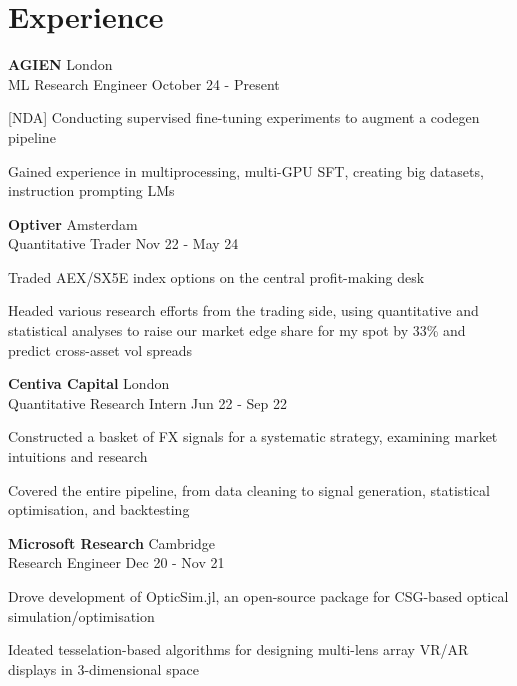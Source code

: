 \documentclass[letterpaper, 10pt]{article}
\begin{document}
\section*{Experience}
\textbf{AGIEN} \hfill {London}\\
ML Research Engineer \hfill October 24 - Present
\begin{compact}
        \item {[NDA]} Conducting supervised fine-tuning experiments to augment a codegen pipeline
        \item Gained experience in multiprocessing, multi-GPU SFT, creating big datasets, instruction prompting LMs
\end{compact}
\vspace{.5\baselineskip}
\textbf{Optiver} \hfill Amsterdam\\
Quantitative Trader \hfill Nov 22 - May 24
\begin{compact}
	\item Traded AEX/SX5E index options on the central profit-making desk%
	\item Headed various research efforts from the trading side, using quantitative and statistical analyses to raise our market edge share for my spot by 33\% and predict cross-asset vol spreads
\end{compact}
\vspace{.5\baselineskip}
\textbf{Centiva Capital} \hfill London\\
Quantitative Research Intern \hfill Jun 22 - Sep 22
\begin{compact}
	\item Constructed a basket of FX signals for a systematic strategy, examining market intuitions and research
	\item Covered the entire pipeline, from data cleaning to signal generation, statistical optimisation, and backtesting
\end{compact}
\vspace{.5\baselineskip}
\textbf{Microsoft Research} \hfill Cambridge\\
Research Engineer \hfill Dec 20 - Nov 21
\begin{compact}
	\item Drove development of OpticSim.jl, an open-source package for CSG-based optical simulation/optimisation
	\item Ideated tesselation-based algorithms for designing multi-lens array VR/AR displays in 3-dimensional space
\end{compact}
\end{document}
